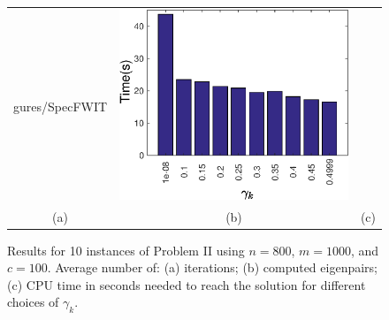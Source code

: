 \begin{figure}[H]
\begin{tabular}{ccc}
gures/SpecFWIT} & \includegraphics[scale=\myscale]{figures/Spectime} \\
		(a)                                              & (b)                                                & (c)                                                \\
	\end{tabular}
	\caption[Results for 10 instances of Problem II]{Results for 10 instances of Problem II using $n=800$, $m=1000$, and $c=100$. Average number of: (a) iterations; (b) computed eigenpairs; (c)  CPU time in seconds needed to reach the solution for different choices of $\gamma_k$.}
	\label{Spec}
\end{figure}

